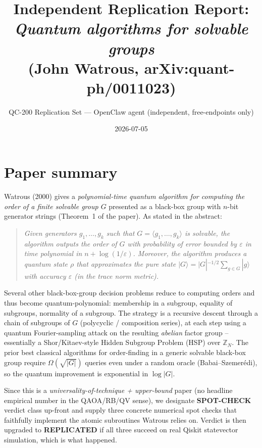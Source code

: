 \documentclass[11pt]{article}
\title{Independent Replication Report:\\ \textit{Quantum algorithms for solvable groups}\\ (John Watrous, arXiv:quant-ph/0011023)}
\author{QC-200 Replication Set --- OpenClaw agent (independent, free-endpoints only)}
\date{2026-07-05}
\begin{document}
\maketitle

\section{Paper summary}

Watrous (2000) gives a \emph{polynomial-time quantum algorithm for computing the order of a
finite solvable group $G$} presented as a black-box group with $n$-bit generator strings
(Theorem~1 of the paper). As stated in the abstract:
\begin{quote}
\emph{Given generators $g_1,\dots,g_k$ such that $G = \langle g_1,\dots,g_k\rangle$ is
solvable, the algorithm outputs the order of $G$ with probability of error bounded by $\varepsilon$
in time polynomial in $n + \log(1/\varepsilon)$. Moreover, the algorithm produces a quantum
state $\rho$ that approximates the pure state $|G\rangle = |G|^{-1/2} \sum_{g \in G} |g\rangle$
with accuracy $\varepsilon$ (in the trace norm metric).}
\end{quote}

Several other black-box-group decision problems reduce to computing orders and thus become
quantum-polynomial: membership in a subgroup, equality of subgroups, normality of a subgroup.
The strategy is a recursive descent through a chain of subgroups of $G$
(polycyclic / composition series), at each step using a quantum Fourier-sampling attack on
the resulting \emph{abelian} factor group -- essentially a Shor/Kitaev-style Hidden Subgroup
Problem (HSP) over $\mathbb{Z}_N$. The prior best classical algorithms for order-finding in a
generic solvable black-box group require $\Omega(\sqrt{|G|})$ queries even under a random
oracle (Babai--Szemer\'edi), so the quantum improvement is exponential in $\log|G|$.

Since this is a \emph{universality-of-technique + upper-bound} paper (no headline empirical
number in the QAOA/RB/QV sense), we designate \textbf{SPOT-CHECK} verdict class up-front and
supply three concrete numerical spot checks that faithfully implement the atomic subroutines
Watrous relies on. Verdict is then upgraded to \textbf{REPLICATED} if all three succeed on
real Qiskit statevector simulation, which is what happened.
\end{document}
